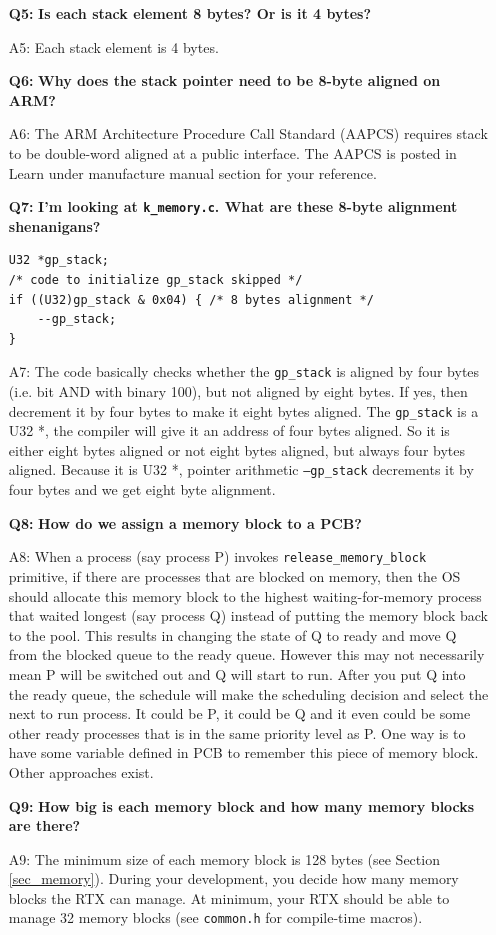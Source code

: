 \begin{itemize}
\item[{\bf Q5:}] {\bf Is each stack element 8 bytes? Or is it 4 bytes?}
\item[A5:]
Each stack element is 4 bytes. 

\item[{\bf Q6:}] {\bf Why does the stack pointer need to be 8-byte aligned on ARM?}
\item[A6:]
The ARM Architecture Procedure Call Standard (AAPCS) requires stack to be double-word aligned at a public interface. The AAPCS is posted in Learn under manufacture manual section for your reference.

\item[{\bf Q7:}] {\bf I'm looking at \verb+k_memory.c+. What are these 8-byte alignment shenanigans?}
\begin{lstlisting}
U32 *gp_stack;
/* code to initialize gp_stack skipped */
if ((U32)gp_stack & 0x04) { /* 8 bytes alignment */
    --gp_stack; 
}
\end{lstlisting}
\item[A7:]
The code basically checks whether the \verb+gp_stack+ is aligned by four bytes (i.e. bit AND with binary 100), but not aligned by eight bytes. If yes, then decrement it by four bytes to make it eight bytes aligned. The \verb+gp_stack+ is a U32 *, the compiler will give it an address of four bytes aligned. So it is either eight bytes aligned or not eight bytes aligned, but always four bytes aligned. Because it is U32 *, pointer arithmetic \verb+–gp_stack+ decrements it by four bytes and we get eight byte alignment.

\item[{\bf Q8:}] {\bf How do we assign a memory block to a PCB?}
\item[A8:] When a process (say process P) invokes \verb+release_memory_block+ primitive, if there are processes that are blocked on memory, then the OS should allocate this memory block to the highest waiting-for-memory process that waited longest (say process Q) instead of putting the memory block back to the pool. This results in changing the state of Q to ready and move Q from the blocked queue to the ready queue. However this may not necessarily mean P will be switched out and Q will start to run. After you put Q into the ready queue, the schedule will make the scheduling decision and select the next to run process. It could be P, it could be Q and it even could be some other ready processes that is in the same priority level as P. One way is to have some variable defined in PCB to remember this piece of memory block. Other approaches exist.

\item[{\bf Q9:}] {\bf How big is each memory block and how many memory blocks are there?}
\item[A9:] The minimum size of each memory block is 128 bytes (see Section \ref{sec_memory}). During your development, you decide how many memory blocks the RTX can manage. At minimum, your RTX should be able to manage 32 memory blocks (see \verb+common.h+ for compile-time macros).   
\end{itemize}

